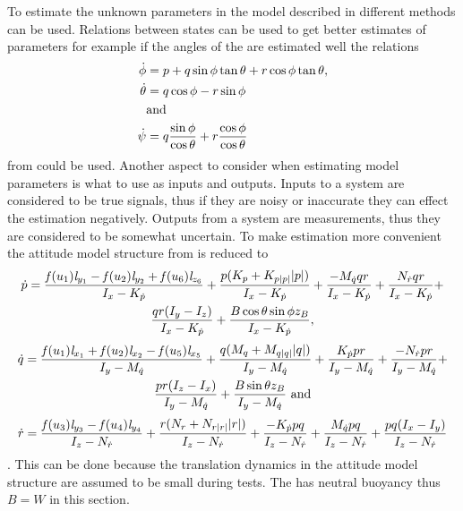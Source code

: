 To estimate the unknown parameters in the \abbrROV model described in  different methods can be used. Relations between states can be used to get better estimates of parameters for example if the angles of the \abbrROV are estimated well the relations
\begin{align}
\dot{\phi} &= p + q \sin \phi \tan \theta + r \cos \phi \tan \theta,\\
\dot{\theta} &= q \cos \phi - r \sin \phi \\
&\textrm{and} \nonumber \\
\dot{\psi} &= q \frac{\sin \phi}{\cos \theta} + r \frac{\cos \phi}{\cos \theta}
\end{align}
from  could be used. Another aspect to consider when estimating model parameters is what to use as inputs and outputs. Inputs to a system are considered to be true signals, thus if they are noisy or inaccurate they can effect the estimation negatively. Outputs from a system are measurements, thus they are considered to be somewhat uncertain. To make estimation more convenient the attitude model structure from  is reduced to 
\begin{multline} \label{eq:p_dotWithoutTranslation}
\dot{p} = \frac{\mathit{f}(u_{1}) \mathit{l}_{y_{1}} - \mathit{f}(u_{2}) \mathit{l}_{y_{2}} + \mathit{f}(u_{6}) \mathit{l}_{z_{6}}}{I_{x} - K_{\dot{p}}} + \frac{p (K_{p} + K_{p|p|} |p|)}{I_{x} - K_{\dot{p}}} + \frac{-M_{\dot{q}} q r}{I_{x} - K_{\dot{p}}} + \frac{N_{\dot{r}} q r}{I_{x} - K_{\dot{p}}} +\\
\frac{q r (I_{y} - I_{z})}{I_{x} - K_{\dot{p}}} + \frac{B \cos{\theta} \sin{\phi} z_B}{I_{x} - K_{\dot{p}}},
\end{multline} 
\begin{multline} \label{eq:q_dotWithoutTranslation}
\dot{q} =\frac{\mathit{f}(u_{1}) \mathit{l}_{x_{1}} + \mathit{f}(u_{2}) \mathit{l}_{x_{2}} - \mathit{f}(u_{5}) \mathit{l}_{x_{5}}}{I_{y} - M_{\dot{q}}} + \frac{q (M_{q} + M_{q|q|} |q|)}{I_{y} - M_{\dot{q}}} + \frac{K_{\dot{p}} p r}{I_{y} - M_{\dot{q}}} + \frac{-N_{\dot{r}} p r}{I_{y} - M_{\dot{q}}} +\\
\frac{p r (I_{z} - I_{x})}{I_{y} - M_{\dot{q}}} + \frac{B \sin{\theta} z_B}{I_{y} - M_{\dot{q}}}\ \textrm{and}
\end{multline} 
\begin{multline} \label{eq:r_dotWithoutTranslation}
\dot{r} = \frac{\mathit{f}(u_{3}) \mathit{l}_{y_{3}} - \mathit{f}(u_{4}) \mathit{l}_{y_{4}}}{I_{z} - N_{\dot{r}}} + \frac{r (N_{r} + N_{r|r|} |r|)}{I_{z} - N_{\dot{r}}} + \frac{-K_{\dot{p}} p q}{I_{z} - N_{\dot{r}}} + \frac{M_{\dot{q}} p q}{I_{z} - N_{\dot{r}}} + \frac{p q (I_{x} - I_{y})}{I_{z} - N_{\dot{r}}}
\end{multline}. 
This can be done because the translation dynamics in the attitude model structure are assumed to be small during tests. The \abbrROV has neutral buoyancy thus $B = W$ in this section.

